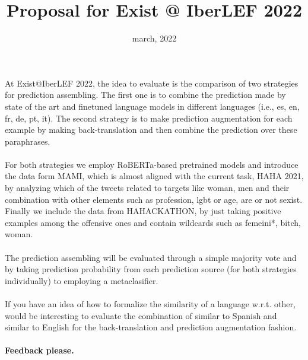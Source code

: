\documentclass[11pt]{article}
\title{Proposal for Exist @ IberLEF 2022  }
\date{\vspace{-13mm}march, 2022}
\begin{document}
	\maketitle 	
	
	
	At Exist@IberLEF 2022, the idea to evaluate is the comparison of two strategies for prediction assembling. The first one is to combine the prediction made by state of the art and finetuned language models in different languages (i.e., es, en, fr, de, pt, it). The second strategy is to make prediction augmentation for each example by making back-translation and then combine the prediction over these paraphrases.
	\\\\	
	For both strategies we employ RoBERTa-based pretrained models and introduce the data form MAMI, which is almost aligned with the current task, HAHA 2021, by analyzing which of the tweets related to targets like woman, men and their combination with other elements such as profession, lgbt or age, are or not sexist. Finally we include the data from  HAHACKATHON, by just taking positive examples among the offensive ones and contain wildcards such as femeini*, bitch, woman.
	\\\\	
	The prediction assembling will be evaluated through a simple majority vote and by taking prediction probability from each prediction source (for both strategies individually) to employing a metaclasifier.\\\\	
	If you have an idea of how to formalize the similarity of a language w.r.t. other, would be interesting to evaluate the combination of similar to Spanish and similar to English for the back-translation and prediction augmentation fashion.\\\\
	\textbf{Feedback please.}
\end{document}
